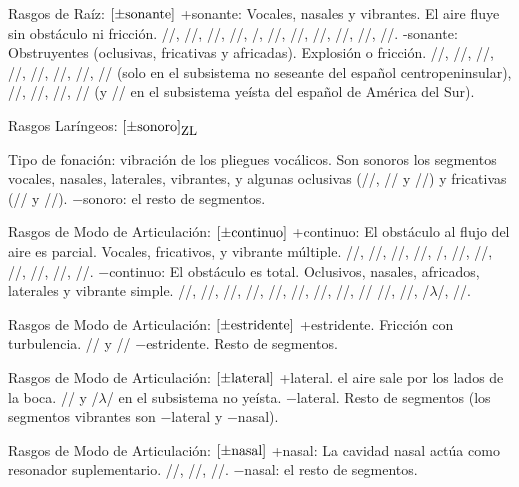 \documentclass[12pt]{article}
\def\feat#1{$[\pm\hbox{#1}]$}%
\def\ZL#1{$[\pm\hbox{#1}]_{\rlap{\small ZL}}$}%
\begin{document}
	
\pex  Rasgos de Raíz:	\feat{sonante}
\a  +sonante: Vocales, nasales y vibrantes. El aire fluye sin obstáculo ni fricción. //, //, //, //, /, //, //, /\textltailn/, //, //, //.
\a -sonante: Obstruyentes (oclusivas, fricativas y africadas). Explosión o fricción. //, //, //, //, //, //, //, // (solo en el subsistema no seseante del español centropeninsular), //, /\texttoptiebar{\textteshlig}/, //, // (y // en el subsistema yeísta del español de América del Sur).
\xe



	\pex Rasgos Laríngeos: \ZL{sonoro}

\a Tipo de fonación: vibración de los pliegues vocálicos.
\a Son sonoros los segmentos vocales, nasales, laterales, vibrantes, y algunas oclusivas (//, // y //) y fricativas (// y //).
\a $-$sonoro: el resto de segmentos.
\xe




	\pex Rasgos de Modo de Articulación: \feat{continuo}
\a +continuo: El obstáculo al flujo del aire es parcial. Vocales, fricativos, y vibrante múltiple. //, //, //, //, /,  //, //, //, //, //, //.
\a $-$continuo: El obstáculo es total. Oclusivos, nasales, africados, laterales y vibrante simple. //, //, //, //, //, //, //, //, /\textltailn/ /\texttoptiebar{\textteshlig}/, //, /$\lambda$/, //.
\xe




	\pex Rasgos de Modo de Articulación: \feat{estridente}
\a +estridente. Fricción con turbulencia. // y //
\a  $-$estridente. Resto de segmentos.
\xe




	\pex Rasgos de Modo de Articulación: \feat{lateral}
\a +lateral. el aire sale por los lados de la boca. // y /$\lambda$/ en el subsistema no yeísta.
\a  $-$lateral. Resto de segmentos (los segmentos vibrantes son $-$lateral y $-$nasal).
\xe




	\pex Rasgos de Modo de Articulación: \feat{nasal}
\a +nasal: La cavidad nasal actúa como resonador suplementario. //, //, /\textltailn/.
\a $-$nasal: el resto de segmentos.
\xe
\end{document}
